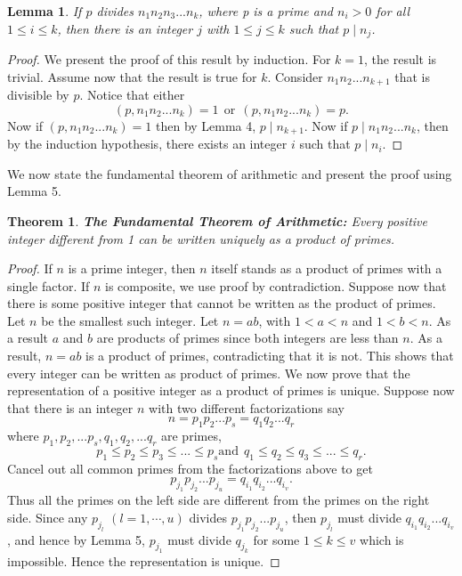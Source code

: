 \documentclass[12pt,letterpaper]{book}
\newtheorem{theorem}{Theorem}
\newtheorem{lemma}{Lemma}
\begin{document}
\begin{lemma}\label{lemma5}
If $p$ divides $n_1n_2n_3...n_k$, where p is a prime and $n_i >0$
for all\\ $1\leq i\leq k$, then there is an integer $j$ with $1\leq
j\leq k$ such that $p \mid n_j$.
\end{lemma}

\begin{proof}
We present the proof of this result by induction.  For $k=1$, the
result is trivial.  Assume now that the result is true for $k$.
Consider $n_1n_2...n_{k+1}$ that is divisible by $p$.  Notice that
either
\begin{equation*}
(p,n_1n_2...n_k)=1\ \  \mbox{or}  \ \ (p,n_1n_2...n_{k})=p.
\end{equation*}
Now if $(p,n_1n_2...n_k)=1$ then by Lemma 4, $p \mid n_{k+1}$. Now
if $p\mid n_1n_2...n_k$, then by the induction hypothesis, there
exists an integer $i$ such that $p\mid n_i$.
\end{proof}

We now state the fundamental theorem of arithmetic and present the
proof using Lemma 5. 
\begin{theorem}\label{fta}
\textbf{The Fundamental Theorem of Arithmetic:}  Every positive
integer different from 1 can be written uniquely as a product of
primes.
\end{theorem}

\begin{proof}
If $n$ is a prime integer, then $n$ itself stands as a product of
primes with a single factor.  If $n$ is composite, we use proof by
contradiction.  Suppose now that there is some positive integer that
cannot be written as the product of primes.  Let $n$ be the smallest
such integer.  Let $n=ab$, with $1<a<n$ and $1<b<n$.  As a result
$a$ and $b$ are products of primes since both integers are less than
$n$.  As a result, $n=ab$ is a product of primes, contradicting that it is not. This shows that
every integer can be written as product of primes. We now prove that
the representation of a positive integer as a product of primes is
unique.  Suppose now that there is an integer $n$ with two different
factorizations say
\begin{equation*}
n=p_1p_2...p_s=q_1q_2...q_r
\end{equation*}
where $p_1,p_2,...p_s,q_1,q_2,...q_r$ are primes,
\begin{equation*}
 p_1\leq p_2 \leq
p_3\leq ...\leq p_s \mbox{and} \ \  q_1 \leq q_2 \leq q_3 \leq ...
\leq q_r.
\end{equation*}
Cancel out all common primes from the factorizations above to get
\begin{equation*}
p_{j_1}p_{j_2}...p_{j_u}=q_{i_1}q_{i_2}...q_{i_v}.
\end{equation*}
Thus all the primes on the left side are different from the primes
on the right side. Since any $p_{j_l}$ $(l=1,\cdots,u)$ divides $p_{j_1}p_{j_2}...p_{j_u}$,
then $p_{j_l}$ must divide $q_{i_1}q_{i_2}...q_{i_v}$, and hence by Lemma 5, $p_{j_1}$ must divide $q_{j_k}$ for
some $1\leq k \leq v$ which is impossible.  Hence the representation
is unique.
\end{proof}
\end{document}
